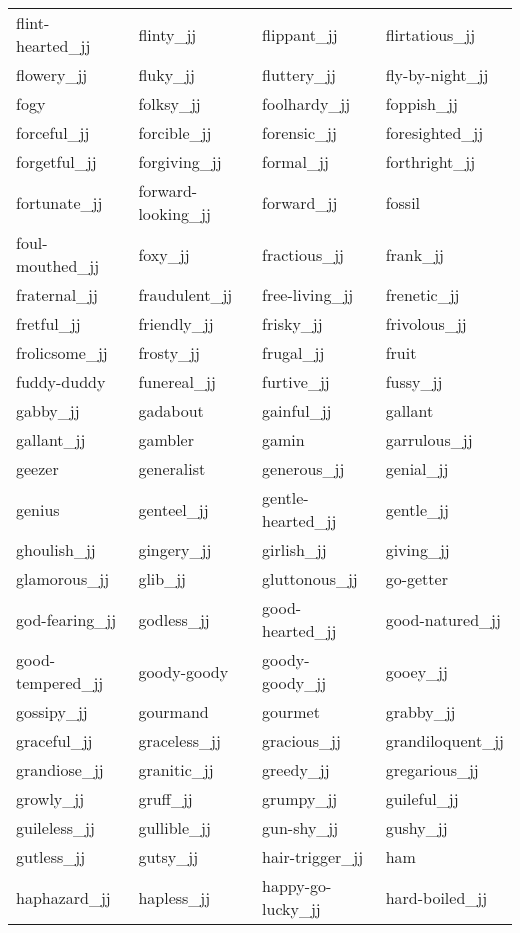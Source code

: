 \begin{longtable}[!htbp]{| llll |}
   flint-hearted\_jj & flinty\_jj & flippant\_jj & flirtatious\_jj \\
   flowery\_jj & fluky\_jj & fluttery\_jj & fly-by-night\_jj \\
   fogy & folksy\_jj & foolhardy\_jj & foppish\_jj \\
   forceful\_jj & forcible\_jj & forensic\_jj & foresighted\_jj \\
   forgetful\_jj & forgiving\_jj & formal\_jj & forthright\_jj \\
   fortunate\_jj & forward-looking\_jj & forward\_jj & fossil \\
   foul-mouthed\_jj & foxy\_jj & fractious\_jj & frank\_jj \\
   fraternal\_jj & fraudulent\_jj & free-living\_jj & frenetic\_jj \\
   fretful\_jj & friendly\_jj & frisky\_jj & frivolous\_jj \\
   frolicsome\_jj & frosty\_jj & frugal\_jj & fruit \\
   fuddy-duddy & funereal\_jj & furtive\_jj & fussy\_jj \\
   gabby\_jj & gadabout & gainful\_jj & gallant \\
   gallant\_jj & gambler & gamin & garrulous\_jj \\
   geezer & generalist & generous\_jj & genial\_jj \\
   genius & genteel\_jj & gentle-hearted\_jj & gentle\_jj \\
   ghoulish\_jj & gingery\_jj & girlish\_jj & giving\_jj \\
   glamorous\_jj & glib\_jj & gluttonous\_jj & go-getter \\
   god-fearing\_jj & godless\_jj & good-hearted\_jj & good-natured\_jj \\
   good-tempered\_jj & goody-goody & goody-goody\_jj & gooey\_jj \\
   gossipy\_jj & gourmand & gourmet & grabby\_jj \\
   graceful\_jj & graceless\_jj & gracious\_jj & grandiloquent\_jj \\
   grandiose\_jj & granitic\_jj & greedy\_jj & gregarious\_jj \\
   growly\_jj & gruff\_jj & grumpy\_jj & guileful\_jj \\
   guileless\_jj & gullible\_jj & gun-shy\_jj & gushy\_jj \\
   gutless\_jj & gutsy\_jj & hair-trigger\_jj & ham \\
   haphazard\_jj & hapless\_jj & happy-go-lucky\_jj & hard-boiled\_jj \\

\end{longtable}
